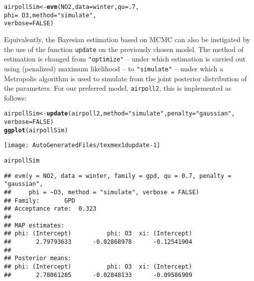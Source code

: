 \documentclass[10pt]{article}\usepackage[]{graphicx}\usepackage[]{color}
\makeatletter
\def\maxwidth{ %
  \ifdim\Gin@nat@width>\linewidth
    \linewidth
  \else
    \Gin@nat@width
  \fi
}
\newcommand{\hlnum}[1]{\textcolor[rgb]{0.686,0.059,0.569}{#1}}%
\newcommand{\hlstr}[1]{\textcolor[rgb]{0.192,0.494,0.8}{#1}}%
\newcommand{\hlopt}[1]{\textcolor[rgb]{0,0,0}{#1}}%
\newcommand{\hlstd}[1]{\textcolor[rgb]{0.345,0.345,0.345}{#1}}%
\newcommand{\hlkwb}[1]{\textcolor[rgb]{0.69,0.353,0.396}{#1}}%
\newcommand{\hlkwc}[1]{\textcolor[rgb]{0.333,0.667,0.333}{#1}}%
\newcommand{\hlkwd}[1]{\textcolor[rgb]{0.737,0.353,0.396}{\textbf{#1}}}%
\newenvironment{kframe}{%
 \def\at@end@of@kframe{}%
 \ifinner\ifhmode%
  \def\at@end@of@kframe{\end{minipage}}%
  \begin{minipage}{\columnwidth}%
 \fi\fi%
 \def\FrameCommand##1{\hskip\@totalleftmargin \hskip-\fboxsep
 \colorbox{shadecolor}{##1}\hskip-\fboxsep
     \hskip-\linewidth \hskip-\@totalleftmargin \hskip\columnwidth}%
 \MakeFramed {\advance\hsize-\width
   \@totalleftmargin\z@ \linewidth\hsize
   \@setminipage}}%
 {\par\unskip\endMakeFramed%
 \at@end@of@kframe}
\newenvironment{knitrout}{}{} %
\makeatother
\begin{document}
\begin{knitrout}
\color{fgcolor}\begin{kframe}
\begin{alltt}
\hlstd{airpollSim} \hlkwb{<-} \hlkwd{evm}\hlstd{(NO2,} \hlkwc{data}\hlstd{=winter,} \hlkwc{qu}\hlstd{=}\hlnum{.7}\hlstd{,}
                  \hlkwc{phi}\hlstd{=}\hlopt{~}\hlstd{O3,} \hlkwc{method}\hlstd{=}\hlstr{"simulate"}\hlstd{,}
                  \hlkwc{verbose}\hlstd{=}\hlnum{FALSE}\hlstd{)}
\end{alltt}
\end{kframe}
\end{knitrout}

Equivalently, the Bayesian estimation based on MCMC can also be instigated by the use of the function {\tt update} on the previously chosen model.  The method of estimation is changed from {\tt "optimize"} -- under which estimation is carried out using (penalized) maximum likelihood -- to {\tt "simulate"} -- under which a Metropolis algorithm is used to simulate from the joint posterior distribution of the parameters.  For our preferred model, {\tt airpoll2}, this is implemented as follows:

\begin{knitrout}
\color{fgcolor}\begin{kframe}
\begin{alltt}
\hlstd{airpollSim} \hlkwb{<-} \hlkwd{update}\hlstd{(airpoll2,}\hlkwc{method}\hlstd{=}\hlstr{"simulate"}\hlstd{,}\hlkwc{penalty}\hlstd{=}\hlstr{"gaussian"}\hlstd{,}
                     \hlkwc{verbose}\hlstd{=}\hlnum{FALSE}\hlstd{)}
\hlkwd{ggplot}\hlstd{(airpollSim)}
\end{alltt}
\end{kframe}
\texttt{[image: AutoGeneratedFiles/texmex1dupdate-1]} 
\begin{kframe}\begin{alltt}
\hlstd{airpollSim}
\end{alltt}
\begin{verbatim}
## evm(y = NO2, data = winter, family = gpd, qu = 0.7, penalty = "gaussian", 
##     phi = ~O3, method = "simulate", verbose = FALSE)
## Family:       GPD 
## Acceptance rate:  0.323
## 
## MAP estimates:
## phi: (Intercept)          phi: O3  xi: (Intercept) 
##       2.79793633      -0.02868978      -0.12541904 
## 
## Posterior means:
## phi: (Intercept)          phi: O3  xi: (Intercept) 
##       2.78061285      -0.02848133      -0.09586909
\end{verbatim}
\end{kframe}
\end{knitrout}
\end{document}
